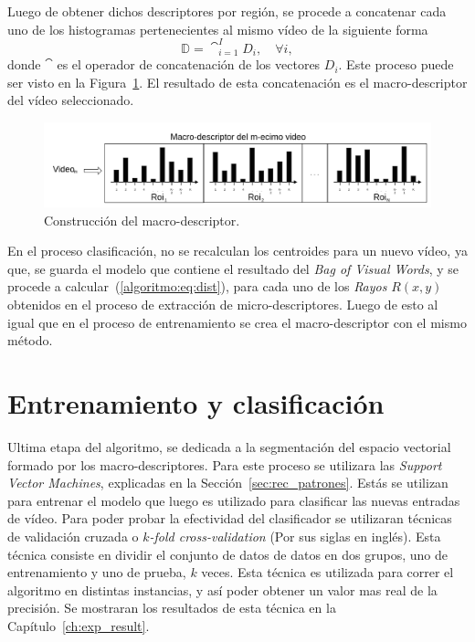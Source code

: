 	
	Luego de obtener dichos descriptores por región, se procede a concatenar cada uno de los histogramas pertenecientes al mismo vídeo de la siguiente forma
	\begin{equation}
		\mathds{D} = \cat_{i = 1}^{I} D_i, \quad \forall i,
	\end{equation}	   
   donde $\cat$ es el operador de concatenación de los vectores $D_i$. Este proceso puede ser visto en la Figura~\ref{algoritmo:fig:macrodescriptores}. El resultado de esta concatenación es el macro-descriptor del vídeo seleccionado.
   
   	\begin{figure}[bt]
		\centering
  		\label{algoritmo:fig:macrodescriptores}
    		\includegraphics[width=1\textwidth]{Figuras/Diagramas/macro-descriptor.png}
  		\caption{Construcción del macro-descriptor.}
	\end{figure}	


	En el proceso clasificación, no se recalculan los centroides para un nuevo vídeo, ya que, se guarda el modelo que contiene el resultado del \textit{Bag of Visual Words}, y se procede a calcular~(\ref{algoritmo:eq:dist}), para cada uno de los \textit{Rayos} $R(x,y)$ obtenidos en el proceso de extracción de micro-descriptores. Luego de esto al igual que en el proceso de entrenamiento se crea el macro-descriptor con el mismo método.
	
	
\section{Entrenamiento y clasificación}
\label{sec:clasificacion}
Ultima etapa del algoritmo, se dedicada a la segmentación del espacio vectorial formado por los macro-descriptores. Para este proceso se utilizara las \textit{Support Vector Machines}, explicadas en la Sección~\ref{sec:rec_patrones}. Estás se utilizan para entrenar el modelo que luego es utilizado para clasificar las nuevas entradas de vídeo. 
Para poder probar la efectividad del clasificador se utilizaran técnicas de validación cruzada o $k$\textit{-fold cross-validation} (Por sus siglas en inglés). Esta técnica consiste en dividir el conjunto de datos de datos en dos grupos, uno de entrenamiento y uno de prueba, $k$ veces. Esta técnica es utilizada para correr el algoritmo en distintas instancias, y así poder obtener un valor mas real de la precisión. Se mostraran los resultados de esta técnica en la Capítulo~\ref{ch:exp_result}.


